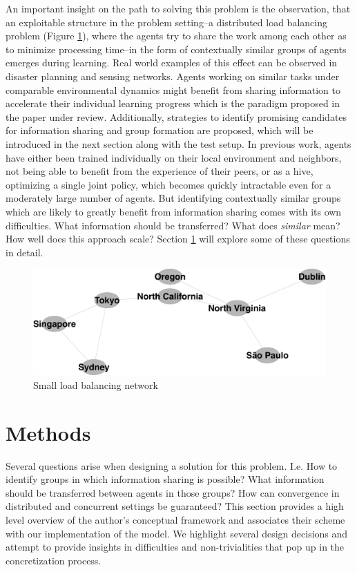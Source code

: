 \documentclass[letterpaper]{article}
\begin{document}
An important insight on the path to solving this problem is the observation, that an exploitable structure in the problem setting--a distributed load balancing problem (Figure \ref{fig:loadbalancing}), where the agents try to share the work among each other as to minimize processing time--in the form of contextually similar groups of agents emerges during learning. Real world examples of this effect can be observed in disaster planning and sensing networks. Agents working on similar tasks under comparable environmental dynamics might benefit from sharing information to accelerate their individual learning progress which is the paradigm proposed in the paper under review. Additionally, strategies to identify promising candidates for information sharing and group formation are proposed, which will be introduced in the next section along with the test setup. In previous work, agents have either been trained individually on their local environment and neighbors, not being able to benefit from the experience of their peers, or as a hive, optimizing a single joint policy, which becomes quickly intractable even for a moderately large number of agents. But identifying contextually similar groups which are likely to greatly benefit from information sharing comes with its own difficulties. What information should be transferred? What does \textit{similar} mean? How well does this approach scale? Section \ref{sec:methods} will explore some of these questions in detail.
\begin{figure}[H]
 \begin{center}
  \includegraphics[width=.7\linewidth]{figures/loadbalancing}
  \caption{Small load balancing network \citep{garant2015accelerating}}
  \label{fig:loadbalancing}
 \end{center}
\end{figure}

\section{Methods} \label{sec:methods}
Several questions arise when designing a solution for this problem. I.e. How to identify groups in which information sharing is possible? What information should be transferred between agents in those groups? How can convergence in distributed and concurrent settings be guaranteed? This section provides a high level overview of the author’s conceptual framework and associates their scheme with our implementation of the model.  We highlight several design decisions and attempt to provide insights in difficulties and non-trivialities that pop up in the concretization process.
\end{document}
